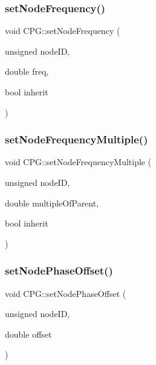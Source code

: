 \mbox{\label{classCPG_a6c8b0a674e597f7559033339621baba9}} 
\subsubsection{\texorpdfstring{set\+Node\+Frequency()}{setNodeFrequency()}}
{\footnotesize\ttfamily void C\+P\+G\+::set\+Node\+Frequency (\begin{DoxyParamCaption}\item[{unsigned}]{node\+ID,  }\item[{double}]{freq,  }\item[{bool}]{inherit }\end{DoxyParamCaption})}

\mbox{\label{classCPG_af04ee786919ee5284041780a1f3e0502}} 
\subsubsection{\texorpdfstring{set\+Node\+Frequency\+Multiple()}{setNodeFrequencyMultiple()}}
{\footnotesize\ttfamily void C\+P\+G\+::set\+Node\+Frequency\+Multiple (\begin{DoxyParamCaption}\item[{unsigned}]{node\+ID,  }\item[{double}]{multiple\+Of\+Parent,  }\item[{bool}]{inherit }\end{DoxyParamCaption})}

\mbox{\label{classCPG_a6333bf3b624bd2742384ddea032a885f}} 
\subsubsection{\texorpdfstring{set\+Node\+Phase\+Offset()}{setNodePhaseOffset()}}
{\footnotesize\ttfamily void C\+P\+G\+::set\+Node\+Phase\+Offset (\begin{DoxyParamCaption}\item[{unsigned}]{node\+ID,  }\item[{double}]{offset }\end{DoxyParamCaption})}

